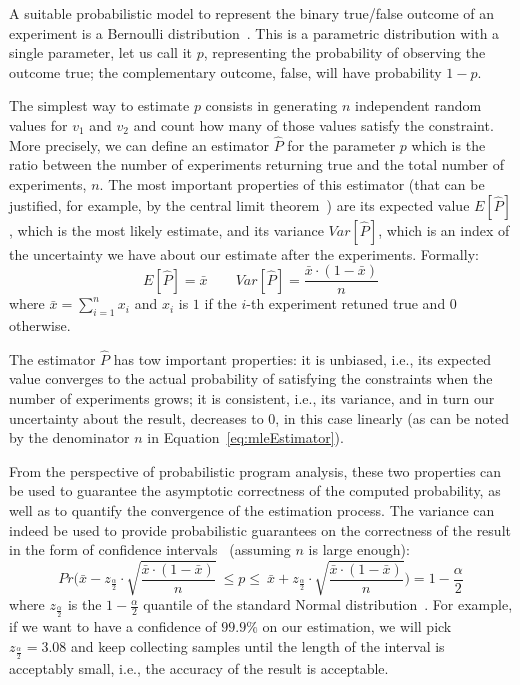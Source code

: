 A suitable probabilistic model to represent the binary true/false outcome of an experiment is a Bernoulli distribution~\cite{pestman1998mathematical}. This is a parametric distribution with a single parameter, let us call it $p$, representing the probability of observing the outcome true; the complementary outcome, false, will have probability $1-p$.

The simplest way to estimate $p$ consists in generating $n$ independent random values for $v_1$ and $v_2$ and count how many of those values satisfy the constraint. More precisely, we can define an estimator $\hat{P}$ for the parameter $p$ which is the ratio between the number of experiments returning true and the total number of experiments, $n$. The most important properties of this estimator (that can be justified, for example, by the central limit theorem~\cite{pestman1998mathematical}) are its expected value $E[\hat{P}]$, which is the most likely estimate, and its variance $Var[\hat{P}]$, which is an index of the uncertainty we have about our estimate after the experiments. Formally:
%
\begin{equation}\label{eq:mleEstimator}
	E[\hat{P}] = \bar{x} \qquad Var[\hat{P}] = \frac{\bar{x} \cdot (1-\bar{x})}{n}
\end{equation}
%
\noindent where $\bar{x}=\sum_{i=1}^n x_i$ and $x_i$ is $1$ if the $i$-th experiment retuned true and $0$ otherwise.

The estimator $\hat{P}$ has tow important properties: it is unbiased, i.e., its expected value converges to the actual probability of satisfying the constraints when the number of experiments grows; it is consistent, i.e., its variance, and in turn our uncertainty about the result, decreases to 0, in this case linearly (as can be noted by the denominator $n$ in Equation~\eqref{eq:mleEstimator}). 

From the perspective of probabilistic program analysis, these two properties can be used to guarantee the asymptotic correctness of the computed probability, as well as to quantify the convergence of the estimation process. The variance can indeed be used to provide probabilistic guarantees on the correctness of the result in the form of confidence intervals~\cite{pestman1998mathematical} (assuming $n$ is large enough):
%
\begin{equation}\label{eqConfidenceInterval}
	Pr\Big( \bar{x} - z_{\frac{\alpha}{2}} \cdot \sqrt{\frac{\bar{x} \cdot (1-\bar{x})}{n}} \ \leq p \leq \ \bar{x} + z_{\frac{\alpha}{2}} \cdot \sqrt{\frac{\bar{x} \cdot (1-\bar{x})}{n}} \Big) = 1-\frac{\alpha}{2}
\end{equation}
%
\noindent where $z_{\frac{\alpha}{2}}$ is the $1-\frac{\alpha}{2}$ quantile of the standard Normal distribution~\cite{pestman1998mathematical}. For example, if we want to have a confidence of $99.9\%$ on our estimation, we will pick $z_{\frac{\alpha}{2}}=3.08$ and keep collecting samples until the length of the interval is acceptably small, i.e., the accuracy of the result is acceptable.

